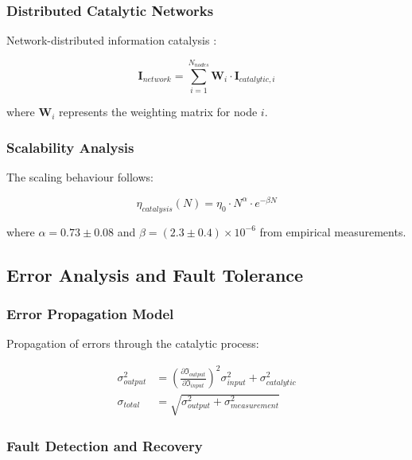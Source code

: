 \documentclass[12pt,a4paper]{article}
\begin{document}
\subsubsection{Distributed Catalytic Networks}

Network-distributed information catalysis \cite{tanenbaum2002distributed}:

\begin{equation}
\mathbf{I}_{network} = \sum_{i=1}^{N_{nodes}} \mathbf{W}_i \cdot \mathbf{I}_{catalytic,i}
\end{equation}

where $\mathbf{W}_i$ represents the weighting matrix for node $i$.

\subsubsection{Scalability Analysis}

The scaling behaviour follows:

\begin{equation}
\eta_{catalysis}(N) = \eta_0 \cdot N^{\alpha} \cdot e^{-\beta N}
\end{equation}

where $\alpha = 0.73 \pm 0.08$ and $\beta = (2.3 \pm 0.4) \times 10^{-6}$ from empirical measurements.

\subsection{Error Analysis and Fault Tolerance}

\subsubsection{Error Propagation Model}

Propagation of errors through the catalytic process:

\begin{align}
\sigma^2_{output} &= \left(\frac{\partial \mathfrak{I}_{output}}{\partial \mathfrak{I}_{input}}\right)^2 \sigma^2_{input} + \sigma^2_{catalytic} \\
\sigma_{total} &= \sqrt{\sigma^2_{output} + \sigma^2_{measurement}}
\end{align}

\subsubsection{Fault Detection and Recovery}
\end{document}
